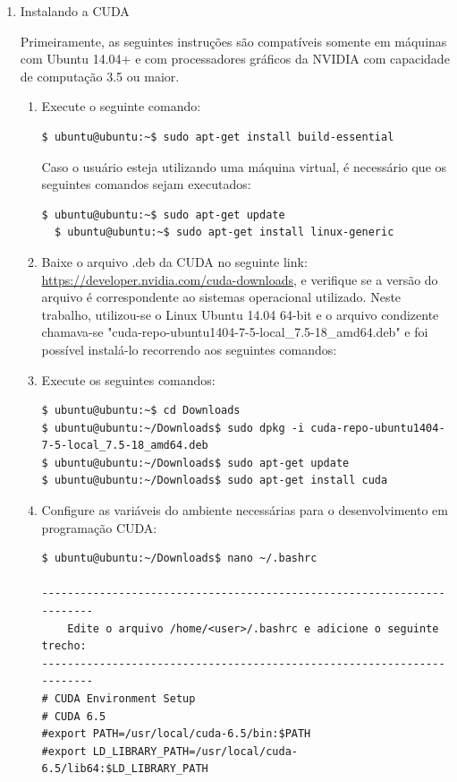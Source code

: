 \begin{enumerate}
 \item Instalando a CUDA
 
 Primeiramente, as seguintes instruções são compatíveis somente em máquinas com Ubuntu 14.04+ e com processadores gráficos da NVIDIA com capacidade de computação 3.5 ou maior. 
 \begin{enumerate}
  \item  Execute o seguinte comando:
  
\begin{lstlisting}[basicstyle=\tiny]
  $ ubuntu@ubuntu:~$ sudo apt-­get install build­-essential
\end{lstlisting}
  
Caso o usuário esteja utilizando uma máquina virtual, é necessário que os seguintes comandos sejam executados:

\begin{lstlisting}[basicstyle=\tiny]
  $ ubuntu@ubuntu:~$ sudo apt-get update
  $ ubuntu@ubuntu:~$ sudo apt-get install linux-generic
\end{lstlisting}

\item Baixe o arquivo .deb da CUDA no seguinte link: \url{https://developer.nvidia.com/cuda-downloads}, e verifique se a versão do arquivo é correspondente ao sistemas operacional utilizado. Neste trabalho, utilizou-se o Linux Ubuntu 14.04 64-bit e o arquivo condizente chamava-se "cuda-repo-ubuntu1404-7-5-local\_7.5-18\_amd64.deb" e foi possível instalá-lo recorrendo aos seguintes comandos:

\item Execute os seguintes comandos:

\begin{lstlisting}[basicstyle=\tiny]
$ ubuntu@ubuntu:~$ cd Downloads
$ ubuntu@ubuntu:~/Downloads$ sudo dpkg -i cuda-repo-ubuntu1404-7-5-local_7.5-18_amd64.deb
$ ubuntu@ubuntu:~/Downloads$ sudo apt-get update
$ ubuntu@ubuntu:~/Downloads$ sudo apt-get install cuda

\end{lstlisting}

\item Configure as variáveis do ambiente necessárias para o desenvolvimento em programação CUDA:
 
\begin{lstlisting}[basicstyle=\tiny]
$ ubuntu@ubuntu:~/Downloads$ nano ~/.bashrc

-----------------------------------------------------------------------
    Edite o arquivo /home/<user>/.bashrc e adicione o seguinte trecho:
-----------------------------------------------------------------------
# CUDA Environment Setup 
# CUDA 6.5
#export PATH=/usr/local/cuda-6.5/bin:$PATH
#export LD_LIBRARY_PATH=/usr/local/cuda-6.5/lib64:$LD_LIBRARY_PATH


\end{lstlisting}
\end{enumerate}
\end{enumerate}

